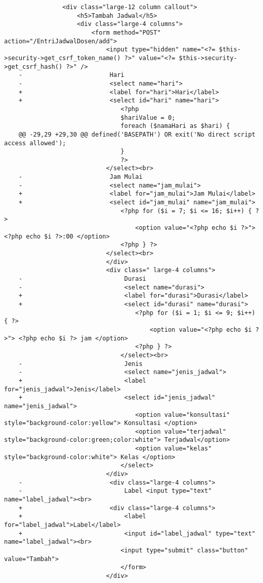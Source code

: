 \begin{lstlisting}
                <div class="large-12 column callout">
                    <h5>Tambah Jadwal</h5>
                    <div class="large-4 columns">
                        <form method="POST" action="/EntriJadwalDosen/add">
                            <input type="hidden" name="<?= $this->security->get_csrf_token_name() ?>" value="<?= $this->security->get_csrf_hash() ?>" />
    -                        Hari
    -                        <select name="hari"> 
    +                        <label for="hari">Hari</label>
    +                        <select id="hari" name="hari"> 
                                <?php
                                $hariValue = 0;
                                foreach ($namaHari as $hari) {
    @@ -29,29 +29,30 @@ defined('BASEPATH') OR exit('No direct script access allowed');
                                }
                                ?>
                            </select><br>
    -                        Jam Mulai
    -                        <select name="jam_mulai"> 
    +                        <label for="jam_mulai">Jam Mulai</label>
    +                        <select id="jam_mulai" name="jam_mulai"> 
                                <?php for ($i = 7; $i <= 16; $i++) { ?>
                                    <option value="<?php echo $i ?>"> <?php echo $i ?>:00 </option>
                                <?php } ?>
                            </select><br>
                            </div>
                            <div class=" large-4 columns">
    -                            Durasi
    -                            <select name="durasi"> 
    +                            <label for="durasi">Durasi</label>
    +                            <select id="durasi" name="durasi"> 
                                    <?php for ($i = 1; $i <= 9; $i++) { ?>
                                        <option value="<?php echo $i ?>"> <?php echo $i ?> jam </option>
                                    <?php } ?>
                                </select><br>
    -                            Jenis  
    -                            <select name="jenis_jadwal"> 
    +                            <label for="jenis_jadwal">Jenis</label>
    +                            <select id="jenis_jadwal" name="jenis_jadwal"> 
                                    <option value="konsultasi" style="background-color:yellow"> Konsultasi </option>
                                    <option value="terjadwal" style="background-color:green;color:white"> Terjadwal</option>
                                    <option value="kelas" style="background-color:white"> Kelas </option>
                                </select>
                            </div>
    -                        <div class="large-4 columns">
    -                            Label <input type="text" name="label_jadwal"><br>
    +                        <div class="large-4 columns">   
    +                            <label for="label_jadwal">Label</label>
    +                            <input id="label_jadwal" type="text" name="label_jadwal"><br>
                                <input type="submit" class="button" value="Tambah">
                                </form>
                            </div>
\end{lstlisting} 

